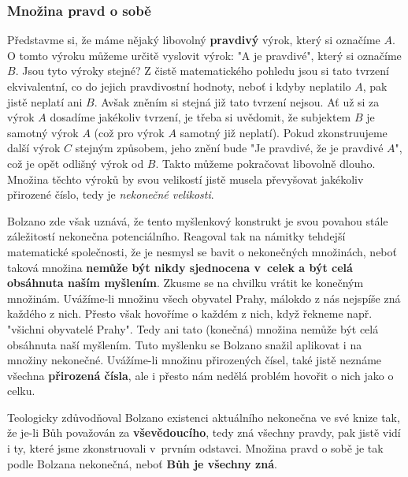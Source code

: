 \subsubsection{Množina pravd o sobě}
Představme si, že máme nějaký libovolný \textbf{pravdivý} výrok, který si označíme $A$. O tomto výroku můžeme určitě vyslovit výrok: "A je pravdivé", který si označíme $B$. Jsou tyto výroky stejné? Z čistě matematického pohledu jsou si tato tvrzení ekvivalentní, co do jejich pravdivostní hodnoty, neboť i kdyby neplatilo $A$, pak jistě neplatí ani $B$. Avšak zněním si stejná již tato tvrzení nejsou. Ať už si za výrok $A$ dosadíme jakékoliv tvrzení, je třeba si uvědomit, že subjektem $B$ je samotný výrok $A$ (což pro výrok $A$ samotný již neplatí). Pokud zkonstruujeme další výrok $C$ stejným způsobem, jeho znění bude "Je pravdivé, že je pravdivé $A$", což je opět odlišný výrok od $B$. Takto můžeme pokračovat libovolně dlouho. Množina těchto výroků by svou velikostí jistě musela převyšovat jakékoliv přirozené číslo, tedy je \emph{nekonečné velikosti}.

Bolzano zde však uznává, že tento myšlenkový konstrukt je svou povahou stále záležitostí nekonečna potenciálního. Reagoval tak na námitky tehdejší matematické společnosti, že je nesmysl se bavit o nekonečných množinách, neboť taková množina \textbf{nemůže být nikdy sjednocena v~celek a být celá obsáhnuta naším myšlením}. Zkusme se na chvilku vrátit ke konečným množinám. Uvážíme-li množinu všech obyvatel Prahy, málokdo z nás nejspíše zná každého z nich. Přesto však hovoříme o každém z nich, když řekneme např. "všichni obyvatelé Prahy". Tedy ani tato (konečná) množina nemůže být celá obsáhnuta naší myšlením. Tuto myšlenku se Bolzano snažil aplikovat i na množiny nekonečné. Uvážíme-li množinu přirozených čísel, také jistě neznáme všechna \textbf{přirozená čísla}, ale i přesto nám nedělá problém hovořit o nich jako o celku.

Teologicky zdůvodňoval Bolzano existenci aktuálního nekonečna ve své knize tak, že je-li Bůh považován za \textbf{vševědoucího}, tedy zná všechny pravdy, pak jistě vidí i ty, které jsme zkonstruovali v~prvním odstavci. Množina pravd o sobě je tak podle Bolzana nekonečná, neboť \textbf{Bůh je všechny zná}.\cite{Bolzano1963}

